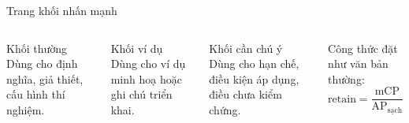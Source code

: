 \documentclass[aspectratio=169,10pt]{beamer}
\begin{document}
\begin{frame}{Trang khối nhấn mạnh}
  \begin{columns}[T,onlytextwidth]
      \begin{block}{Khối thường}
        Dùng cho định nghĩa, giả thiết, cấu hình thí nghiệm.
      \end{block}
      \begin{exampleblock}{Khối ví dụ}
        Dùng cho ví dụ minh hoạ hoặc ghi chú triển khai.
      \end{exampleblock}
      \begin{alertblock}{Khối cần chú ý}
        Dùng cho hạn chế, điều kiện áp dụng, điều chưa kiểm chứng.
      \end{alertblock}
      \vspace{4pt}
      Công thức đặt như văn bản thường:
      \[ \text{retain} = \frac{\text{mCP}}{\text{AP}_{\text{sạch}}} \]
  \end{columns}
\end{frame}

\end{document}
